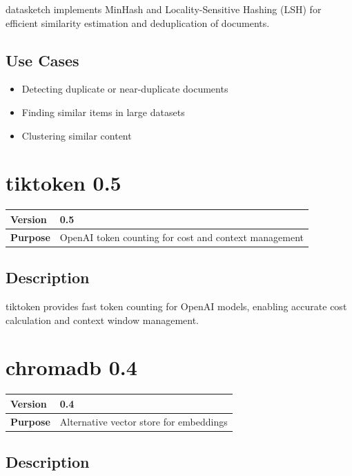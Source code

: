 \documentclass[12pt,a4paper]{report}
\begin{document}
datasketch implements MinHash and Locality-Sensitive Hashing (LSH) for efficient similarity estimation and deduplication of documents.

\subsection{Use Cases}

\begin{itemize}
    \item Detecting duplicate or near-duplicate documents
    \item Finding similar items in large datasets
    \item Clustering similar content
\end{itemize}

\section{tiktoken 0.5}

\begin{tabular}{|p{4cm}|p{10cm}|}
\hline
\textbf{Version} & 0.5 \\
\hline
\textbf{Purpose} & OpenAI token counting for cost and context management \\
\hline
\end{tabular}

\subsection{Description}

tiktoken provides fast token counting for OpenAI models, enabling accurate cost calculation and context window management.

\section{chromadb 0.4}

\begin{tabular}{|p{4cm}|p{10cm}|}
\hline
\textbf{Version} & 0.4 \\
\hline
\textbf{Purpose} & Alternative vector store for embeddings \\
\hline
\end{tabular}

\subsection{Description}
\end{document}
